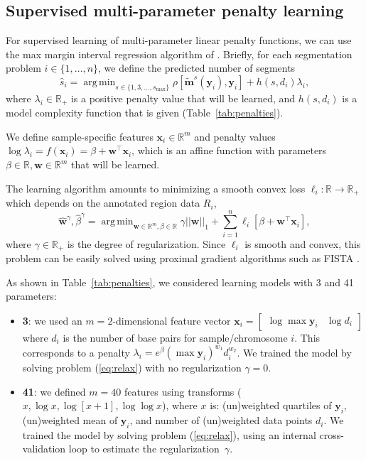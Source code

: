 \documentclass{article}
\DeclareMathOperator*{\argmin}{arg\,min}
\newcommand{\RR}{\mathbb R}
\begin{document}
\subsection{Supervised multi-parameter penalty learning}
\label{sec:supervised}

For supervised learning of multi-parameter linear penalty functions,
we can use the max margin interval regression algorithm of
\citet{HOCKING-penalties}. Briefly, for each segmentation problem
$i\in\{1, \dots, n\}$, we define the predicted number of segments
\begin{equation}
  \hat s_i =
  \argmin_{s\in\{1,3,\dots, s_{\text{max}}\}}
  \rho\left[
    \mathbf{\tilde m}^s(\mathbf y_i),
    \mathbf y_i
  \right]
  + h(s, d_i) \lambda_i,
\end{equation}
where $\lambda_i\in\RR_+$ is a positive penalty value that will be
learned, and $h(s, d_i)$ is a model complexity function that is given
(Table~\ref{tab:penalties}).

We define sample-specific features $\mathbf x_i\in\RR^m$ and penalty
values $\log \lambda_i = f(\mathbf x_i) = \beta + \mathbf w^\intercal
\mathbf x_i$, which is an affine function with parameters
$\beta\in\RR,\mathbf w\in\RR^m$ that will be learned. 

The learning algorithm amounts to minimizing a
smooth convex loss $\ell_i:\RR\rightarrow\RR_+$ which depends on the
annotated region data $R_i$,
\begin{equation}
  \label{eq:relax}
  \mathbf{\hat w}^\gamma, \hat \beta^\gamma = \argmin_{\mathbf w\in\RR^m, \beta\in\RR}
  \gamma ||\mathbf w||_1 +
  \sum_{i=1}^n
  \ell_i\left[  \beta+ \mathbf w^\intercal \mathbf x_i \right],
\end{equation}
where $\gamma\in\RR_+$ is the degree of regularization. Since
$\ell_i$ is smooth and convex, this problem can be easily solved using
proximal gradient algorithms such as FISTA \citep{fista}.

As shown in Table~\ref{tab:penalties}, we considered learning models
with 3 and 41 parameters:

\begin{itemize}
\item \textbf{3}: we used an $m=2$-dimensional feature
  vector $\mathbf x_i = \left[\begin{array}{cc} \log\max \mathbf y_i &
      \log d_i
\end{array}\right]$ where $d_i$ is the number of base pairs for 
sample/chromosome $i$.  This corresponds to a penalty $\lambda_i =
e^\beta (\max\mathbf y_i)^{w_1} d_i^{w_2}$. We trained the
model by solving problem (\ref{eq:relax}) with no regularization $\gamma=0$.
\item \textbf{41}: we defined $m=40$ features using transforms ($x,
  \log x, \log[x+1], \log\log x$), where $x$ is: (un)weighted
  quartiles of $\mathbf y_i$, (un)weighted mean of $\mathbf y_i$, and
  number of (un)weighted data points $d_i$. We trained the model by solving
  problem (\ref{eq:relax}), using an internal cross-validation loop to estimate
  the regularization~$\gamma$.
\end{itemize}
\end{document}
